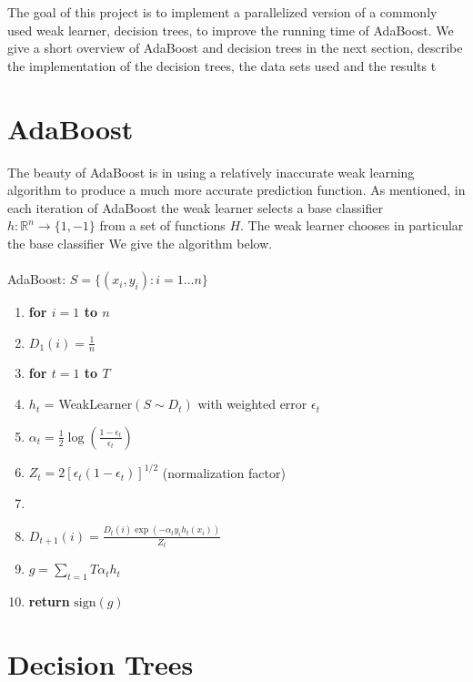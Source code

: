 \documentclass[12pt]{article}
\begin{document}
The goal of this project is to implement a parallelized version of a commonly used weak learner, decision trees, to improve the running time of AdaBoost. We give a short overview of AdaBoost and decision trees in the next section, describe the implementation of the decision trees, the data sets used and the results t 

\section{AdaBoost}
The beauty of AdaBoost is in using a relatively inaccurate weak learning algorithm to produce a much more accurate prediction function. As mentioned, in each iteration of AdaBoost the weak learner selects a base classifier $h: \mathbb{R}^n\rightarrow\{1,-1\}$ from a set of functions $H$. The weak learner chooses in particular the base classifier  We give the algorithm below.\\
\\
{\sc AdaBoost}: $S = \{(x_i,y_i):i = 1\ldots n\}$
\begin{enumerate}
\itemsep1pt \parskip0pt 
\item {\bf for $i=1$ to $n$}
\item \quad $D_1(i) = \frac{1}{n}$
\item {\bf for $t=1$ to $T$}
\item \quad $h_t$ = {\sc WeakLearner}$(S\sim D_t)$ with weighted error $\epsilon_t$
\item \quad $\alpha_t = \frac{1}{2}\log(\frac{1-\epsilon_t}{\epsilon_t})$
\item \quad $Z_t = 2[\epsilon_t(1-\epsilon_t)]^{1/2}$ (normalization factor)
\item {}
\item \quad \quad $D_{t+1}(i) = \frac{D_t(i)\exp(-\alpha_t y_i h_t(x_i))}{Z_t}$
\item $g = \sum_{t=1}{T} \alpha_t h_t$
\item {\bf return} $\mbox{sign}(g)$
\end{enumerate}

\section{Decision Trees}
\end{document}
